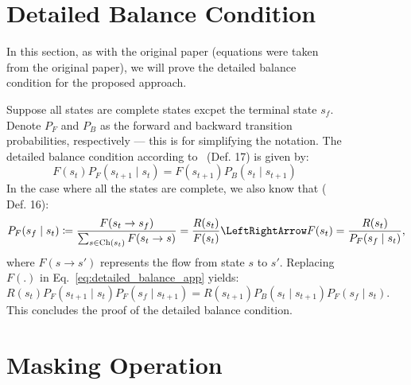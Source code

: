 \documentclass{lxaiproposal}
\begin{document}
\begin{figure}[h]
    \pagebreak
    
    

    \makeappendix

    \appendix

    \renewcommand\theequation{\thesection\arabic{equation}}


    \section{Detailed Balance Condition}\label{app:detailed_balance}
    \vspace*{-3mm}

    In this section, as with the original paper (equations were taken from the original paper), we will prove the detailed balance condition
    for the proposed approach.

    Suppose all states are complete states excpet the terminal state $s_f$. Denote $P_F$ and $P_B$ as the forward
    and backward transition probabilities, respectively --- this is for simplifying the notation. The detailed balance
    condition according to~\cite{bengio2023gflownetfoundations} (Def. 17) is given by:
    \begin{equation}
        F(s_t)P_F(s_{t+1} \mid s_t) = F(s_{t+1})P_B(s_t \mid s_{t+1})
        \label{eq:detailed_balance_app}
    \end{equation}
    In the case where all the states are complete, we also know that (\cite{bengio2023gflownetfoundations} Def. 16):
    \[
        P_F(s_f \mid s_t) \coloneq \frac{F(s_t \to s_f)}{\sum_{s \in \text{Ch}(s_t)} F(s_t \to s)} = \frac{R(s_t)}{F(s_t)}
        \LeftRightArrow F(s_t) = \frac{R(s_t)}{P_F(s_f \mid s_t)},
    \]
    where $F(s \to s')$ represents the flow from state $s$ to  $s'$. Replacing $F(.)$ in Eq.~\eqref{eq:detailed_balance_app}
    yields:
    \begin{equation}
        R(s_t)P_F(s_{t+1} \mid s_t)P_F(s_f \mid s_{t+1}) = R(s_{t+1})P_B(s_t \mid s_{t+1})P_F(s_f \mid s_t).
        \label{eq:detailed_balance_app2}
    \end{equation}
    This concludes the proof of the detailed balance condition.


    \section{Masking Operation}\label{app:masking}
    \vspace*{-3mm}


\end{figure}
\end{document}
